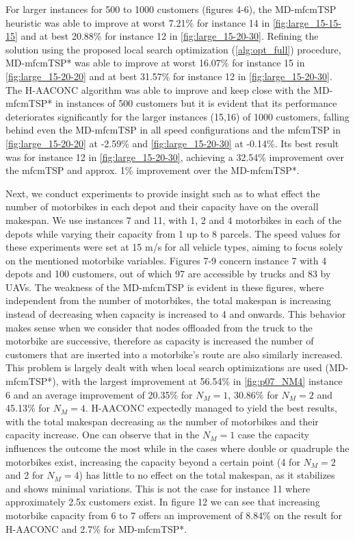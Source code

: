 \documentclass{article}
\begin{document}
	\par
	For larger instances for 500 to 1000 customers (figures 4-6), the MD-mfcmTSP heuristic was able to improve at worst 7.21\% for instance 14 in \autoref{fig:large_15-15-15} and at best 20.88\% for instance 12 in \autoref{fig:large_15-20-30}. Refining the solution using the proposed local search optimization (\autoref{alg:opt_full}) procedure, MD-mfcmTSP* was able to improve at worst 16.07\% for instance 15 in \autoref{fig:large_15-20-20} and at best 31.57\% for instance 12 in \autoref{fig:large_15-20-30}. The H-AACONC algorithm was able to improve and keep close with the MD-mfcmTSP* in instances of 500 customers but it is evident that its performance deteriorates significantly for the larger instances (15,16) of 1000 customers, falling behind even the MD-mfcmTSP in all speed configurations and the mfcmTSP in \autoref{fig:large_15-20-20} at -2.59\% and \ref{fig:large_15-20-30} at -0.14\%. Its best result was for instance 12 in \autoref{fig:large_15-20-30}, achieving a 32.54\% improvement over the mfcmTSP and approx. 1\% improvement over the MD-mfcmTSP*.
	\par 
	Next, we conduct experiments to provide insight such as to what effect the number of motorbikes in each depot and their capacity have on the overall makespan. We use instances 7 and 11, with 1, 2 and 4 motorbikes in each of the depots while varying their capacity from 1 up to 8 parcels. The speed values for these experiments were set at 15 m/s for all vehicle types, aiming to focus solely on the mentioned motorbike variables. Figures 7-9 concern instance 7 with 4 depots and 100 customers, out of which 97 are accessible by trucks and 83 by UAVs. The weakness of the MD-mfcmTSP is evident in these figures, where independent from the number of motorbikes, the total makespan is increasing instead of decreasing when capacity is increased to 4 and onwards. This behavior makes sense when we consider that nodes offloaded from the truck to the motorbike are successive, therefore as capacity is increased the number of customers that are inserted into a motorbike's route are also similarly increased. This problem is largely dealt with when local search optimizations are used (MD-mfcmTSP*), with the largest improvement at 56.54\% in \autoref{fig:p07_NM4} instance 6 and an average improvement of 20.35\% for $N_M=1$, 30.86\% for $N_M=2$ and 45.13\% for $N_M=4$. H-AACONC expectedly managed to yield the best results, with the total makespan decreasing as the number of motorbikes and their capacity increase. One can observe that in the $N_M=1$ case the capacity influences the outcome the most while in the cases where double or quadruple the motorbikes exist, increasing the capacity beyond a certain point (4 for $N_M=2$ and 2 for $N_M=4$) has little to no effect on the total makespan, as it stabilizes and shows minimal variations. This is not the case for instance 11 where approximately 2.5x customers exist. In figure 12 we can see that increasing motorbike capacity from 6 to 7 offers an improvement of 8.84\% on the result for H-AACONC and 2.7\% for MD-mfcmTSP*.
\end{document}
